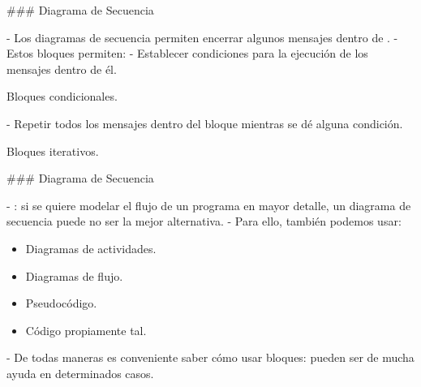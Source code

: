 
### Diagrama de Secuencia


- Los diagramas de secuencia permiten encerrar algunos mensajes dentro de .
- Estos bloques permiten:
    - Establecer condiciones para la ejecución de los mensajes dentro de él.
        \begin{rboxx}{}
        Bloques condicionales.
        \end{rboxx}
    - Repetir todos los mensajes dentro del bloque mientras se dé alguna condición.
        \begin{rboxx}{}
        Bloques iterativos.
        \end{rboxx}

### Diagrama de Secuencia


- : si se quiere modelar el flujo de un programa en mayor detalle, un diagrama de secuencia
puede no ser la mejor alternativa.
    - Para ello, también podemos usar:
\begin{rboxx}{}
    \begin{itemize}
        \item Diagramas de actividades.
        \item Diagramas de flujo.
        \item Pseudocódigo.
        \item Código propiamente tal.
    \end{itemize}
\end{rboxx}
- De todas maneras es conveniente saber cómo usar bloques: pueden ser de mucha ayuda en determinados casos.


